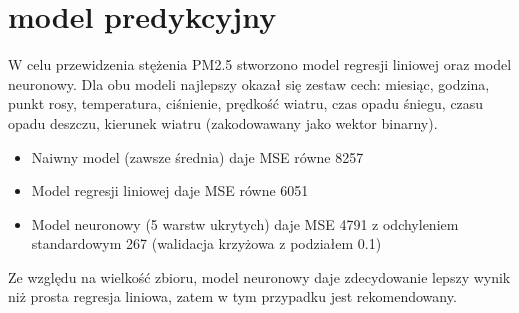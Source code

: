 \documentclass{beamer}
\begin{document}
\section{model predykcyjny}
\begin{frame}
	W celu przewidzenia stężenia PM2.5 stworzono model regresji liniowej oraz model neuronowy. Dla obu modeli najlepszy okazał się zestaw cech:
	miesiąc, godzina, punkt rosy, temperatura, ciśnienie, prędkość wiatru, czas opadu śniegu, czasu opadu deszczu, kierunek wiatru (zakodowawany jako wektor binarny).
	\begin{itemize}
		\item Naiwny model (zawsze średnia) daje MSE równe 8257
		\item Model regresji liniowej daje MSE równe 6051
		\item Model neuronowy (5 warstw ukrytych) daje MSE 4791 z odchyleniem standardowym 267 (walidacja krzyżowa z podziałem 0.1)
	\end{itemize}
	Ze względu na wielkość zbioru, model neuronowy daje zdecydowanie lepszy wynik niż prosta regresja liniowa,
	zatem w tym przypadku jest rekomendowany.
\end{frame}
\end{document}
